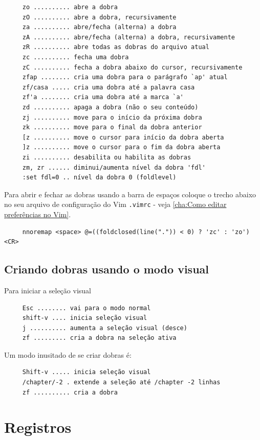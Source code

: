 \documentclass[10pt,a4paper,openany]{book}
\begin{document}
\begin{verbatim}
     zo .......... abre a dobra
     zO .......... abre a dobra, recursivamente
     za .......... abre/fecha (alterna) a dobra
     zA .......... abre/fecha (alterna) a dobra, recursivamente
     zR .......... abre todas as dobras do arquivo atual
     zc .......... fecha uma dobra
     zC .......... fecha a dobra abaixo do cursor, recursivamente
     zfap ........ cria uma dobra para o parágrafo `ap' atual
     zf/casa ..... cria uma dobra até a palavra casa
     zf'a ........ cria uma dobra até a marca `a'
     zd .......... apaga a dobra (não o seu conteúdo)
     zj .......... move para o início da próxima dobra
     zk .......... move para o final da dobra anterior
     [z .......... move o cursor para início da dobra aberta
     ]z .......... move o cursor para o fim da dobra aberta
     zi .......... desabilita ou habilita as dobras
     zm, zr ...... diminui/aumenta nível da dobra 'fdl'
     :set fdl=0 .. nível da dobra 0 (foldlevel)
\end{verbatim}

Para abrir e fechar as dobras usando a barra de
espaços coloque o trecho abaixo no seu arquivo de configuração do Vim
\verb|.vimrc| - veja \ref{cha:Como editar preferências no Vim}.

\begin{verbatim}
     nnoremap <space> @=((foldclosed(line(".")) < 0) ? 'zc' : 'zo')<CR>
\end{verbatim}

\section{Criando dobras usando o modo visual}
\label{Criando folders usando o modo visual}
Para iniciar a seleção visual

\begin{verbatim}
     Esc ........ vai para o modo normal
     shift-v .... inicia seleção visual
     j .......... aumenta a seleção visual (desce)
     zf ......... cria a dobra na seleção ativa
\end{verbatim}

Um modo inusitado de se criar dobras é:

\begin{verbatim}
     Shift-v ..... inicia seleção visual
     /chapter/-2 . extende a seleção até /chapter -2 linhas
     zf .......... cria a dobra
\end{verbatim}

\chapter{Registros}
\label{Registros}
\end{document}

